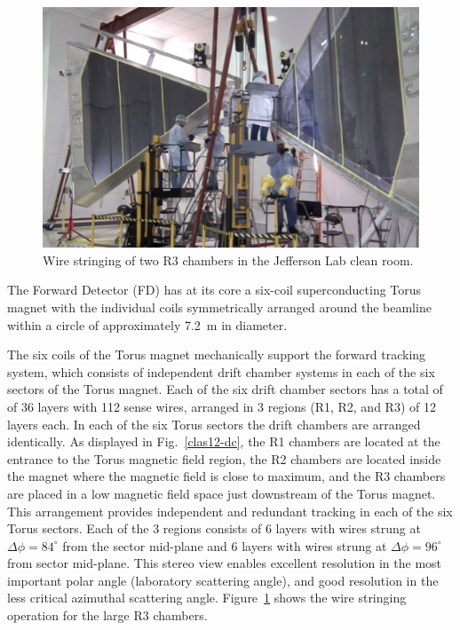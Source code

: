 \documentclass[final,3p,twocolumn]{elsarticle}
\begin{document}
\begin{figure}[htbp!]
\centerline{\includegraphics[width=1.95\columnwidth]{DC-R3.png}}
\caption{Wire stringing of two R3 chambers in the Jefferson Lab clean room.}
\label{dc-stringing}
\end{figure}

The Forward Detector (FD) has at its core a six-coil superconducting Torus magnet with the individual coils
symmetrically arranged around the beamline within a circle of approximately 7.2~m in diameter. 

The six coils of the Torus magnet mechanically support the forward tracking system, which consists of independent
drift chamber systems in each of the six sectors of the Torus magnet. Each of the six drift chamber sectors has a
total of of 36 layers with 112 sense wires, arranged in 3 regions (R1, R2, and R3) of 12 layers each. In each of the six
Torus sectors the drift chambers are arranged identically. As displayed in Fig.~\ref{clas12-dc}, the R1 chambers
are located at the entrance to the Torus magnetic field region, the R2 chambers are located inside the magnet where
the magnetic field is close to maximum, and the R3 chambers are placed in a low magnetic field space just downstream
of the Torus magnet. This arrangement provides independent and redundant tracking in each of the six Torus sectors.
Each of the 3 regions consists of 6 layers with wires strung at $\Delta{\phi} = 84^\circ$ from the sector mid-plane and
6 layers with wires strung at $\Delta{\phi} = 96^\circ$ from sector mid-plane. This stereo view enables excellent
resolution in the most important polar angle (laboratory scattering angle), and good resolution in the less critical
azimuthal scattering angle. Figure~\ref{dc-stringing} shows the wire stringing operation for the large R3 chambers. 
\end{document}
